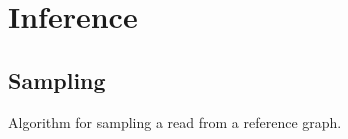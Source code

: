 \section{Inference}

\subsection{Sampling}
Algorithm for sampling a read from a reference graph.



